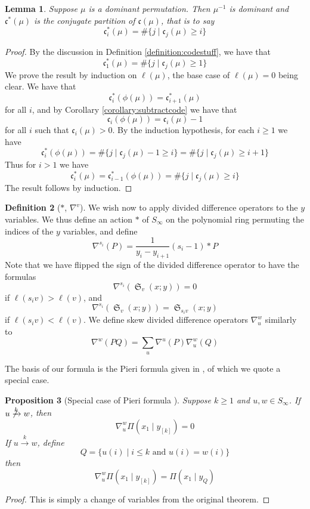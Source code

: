 \documentclass[reqno]{amsart}
\newtheorem{lemma}{Lemma}[subsection]
\newtheorem{proposition}[lemma]{Proposition}
\theoremstyle{definition}
\newtheorem{definition}[lemma]{Definition}
\theoremstyle{remark}
\numberwithin{equation}{subsection}
\DeclareMathOperator{\sch}{\mathfrak{S}}
\newcommand{\tom}[1]{\xrightarrow{#1}}
\newcommand{\smpfu}{\mathsf{\Pi}}
\newcommand{\smpr}[3]{\ensuremath{}\smpfu\left( #1 \mid #2_{[#3]}\right)}
\newcommand{\smpre}[2]{\ensuremath{}\smpfu\left( #1 \mid #2\right)}
\newcommand{\code}{\mathfrak{c}}
\begin{document}
\begin{lemma} \label{lemma:invdom}
	Suppose $\mu$ is a dominant permutation. Then $\mu^{-1}$ is dominant and $\code^*(\mu)$ is the conjugate partition of $\code(\mu)$, that is to say
	$$\code^*_i(\mu)=\#\{j\mid \code_j(\mu)\geq i\}$$
\end{lemma}
\begin{proof}
	By the discussion in Definition \ref{definition:codestuff}, we have that
	$$\code^*_1(\mu)=\#\{j\mid \code_j(\mu)\geq 1\}$$
	We prove the result by induction on $\ell(\mu)$, the base case of $\ell(\mu)=0$ being clear. We have that
	$$\code^*_i(\phi(\mu))=\code^*_{i+1}(\mu)$$
	for all $i$, and by Corollary \ref{corollary:subtractcode} we have that
	$$\code_i(\phi(\mu))=\code_i(\mu)-1$$
	for all $i$ such that $\code_i(\mu)>0$. By the induction hypothesis, for each $i\geq 1$ we have
	$$\code^*_i(\phi(\mu))=\#\{j\mid \code_j(\mu)-1\geq i\}=\#\{j\mid \code_j(\mu)\geq i+1\}$$
	Thus for $i>1$ we have
	$$\code^*_i(\mu)=\code_{i-1}^*(\phi(\mu))=\#\{j\mid \code_j(\mu)\geq i\}$$
	The result follows by induction.
\end{proof}


\begin{definition}[$\ast$, $\nabla^v$] \label{definition:ydiff}
We wish now to apply divided difference operators to the $y$ variables. We thus define an action $*$ of $S_\infty$ on the polynomial ring permuting the indices of the $y$ variables, and define
$$\nabla^{s_i}(P)=\frac1{y_i-y_{i+1}}(s_i-1) * P$$
Note that we have flipped the sign of the divided difference operator to have the formulas
$$\nabla^{s_i}(\sch_v(x;y))=0$$
if $\ell(s_iv)>\ell(v)$, and
$$\nabla^{s_i}(\sch_v(x;y))=\sch_{s_iv}(x;y)$$
if $\ell(s_iv)<\ell(v)$.
We define skew divided difference operators $\nabla_u^w$ similarly to
$$\nabla^w(PQ)=\sum_u \nabla^u(P)\nabla_u^w(Q)$$
\end{definition}

The basis of our formula is the Pieri formula given in \cite{samuelmolev}, of which we quote a special case.

\begin{proposition}[Special case of Pieri formula {\cite[Theorem~7.1]{samuelmolev}}] \label{proposition:pieri}
Suppose $k\geq 1$ and $u,w\in S_\infty$. If $u\not\tom{k} w$, then
$$\nabla_u^w\smpr{x_1}{y}{k}=0$$
If $u\tom{k} w$, define
$$Q = \{u(i)\mid i\leq k\mbox{ and }u(i)=w(i)\}$$
then
$$\nabla_u^w\smpr{x_1}{y}{k}=\smpre{x_1}{y_Q}$$
\end{proposition}
\begin{proof}
	This is simply a change of variables from the original theorem.
\end{proof}
\end{document}
